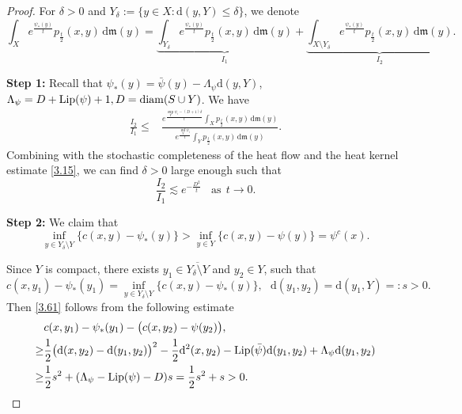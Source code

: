 \documentclass[a4paper,11pt]{article}
\numberwithin{equation}{section}
\theoremstyle{plain}
\theoremstyle{definition}
\theoremstyle{remark}
\newcommand{\mm}{\mathfrak m}
\newcommand{\diam}{\mathop{\rm diam}\nolimits}
\newcommand{\Lip}{\mathop{\rm Lip}\nolimits}
\renewcommand{\d}{{\mathrm d}}
\begin{document}
	\begin{proof}
	For  $\delta>0$ and $Y_\delta:=\{y\in X: \d(y, Y)\leq \delta\}$,  we denote
	\begin{equation}
		\int_X e^{\frac{\psi_{*}(y)}{t}} p_\frac{t}{2}(x,y)\,\d\mm(y)=\underbrace{\int_{Y_\delta} e^{\frac{\psi_{*}(y)}{t}} p_\frac{t}{2}(x,y)\,\d\mm(y)}_{I_1}+\underbrace{\int_{X\setminus Y_\delta} e^{\frac{\psi_{*}(y)}{t}} p_\frac{t}{2}(x,y)\,\d\mm(y)}_{I_2}.
	\end{equation}
	
	{\bf Step 1:} 
Recall that $\psi_{*}(y)=\bar \psi (y)-\Lambda_\psi\d(y,Y)$, $\Lambda_\psi=D+ \Lip(\psi) + 1,  D=\diam(S\cup Y)$.   We have
	\begin{equation}\label{ext}
		\begin{aligned}
			\frac{I_2}{I_1}
			\leq& \frac{e^{\frac{\sup_Y \psi_i-(D+1)\delta}{t}}\int_{X} p_\frac{t}{2}(x,y)\,\d\mm(y)}{e^{\frac{\inf_Y \psi_i}{t}}\int_{Y}  p_\frac{t}{2}(x,y)\,\d\mm(y)}.
		\end{aligned}
	\end{equation}
Combining with the stochastic completeness of the heat flow and the heat kernel estimate \eqref{3.15},    we can find $\delta>0$ large enough such that
 \begin{equation}\label{2.40}
     	\frac{I_2}{I_1}\lesssim  e^{-\frac{D^2}{t}}~~~~\text{as}~~t\to 0.
     \end{equation}
	
	\medskip
	
	{\bf Step 2:} We claim that
	\begin{equation}\label{3.61}
	\inf_{y\in Y_\delta\setminus Y}\{c(x,y)-\psi_{*}(y)\}>\inf_{y\in Y}\{c(x,y)-\psi(y)\}=\psi^c(x).
	\end{equation}
	
	Since $Y$ is compact,  there exists $y_1\in \overline {Y_\delta\setminus Y}$ and $y_2\in Y$,  such that 
	\begin{equation*}
	c(x,y_1)-\psi_{*}(y_1)=\inf_{y\in Y_\delta\setminus Y}\{c(x,y)-\psi_{*}(y)\},~~~\d(y_1,y_2)=\d(y_1,Y)=:s>0.
	\end{equation*}
 Then \eqref{3.61} follows from the following estimate
	\begin{equation}
	\begin{aligned}
	&c(x,y_1)-\psi_{*}(y_1)- \big(c(x,y_2)-\psi(y_2)\big),\\
	\geq & \frac{1}{2}\big(\d(x,y_2)-\d(y_1,y_2)\big)^2-\frac{1}{2}\d^2(x,y_2)-\Lip(\bar \psi)\d(y_1,y_2)+\Lambda_\psi\d(y_1,y_2)\\
	\geq & \frac{1}{2}s^2+(\Lambda_\psi-\Lip(\psi)-D)s=\frac{1}{2}s^2+s>0.
	\end{aligned}
	\end{equation}
	

\end{proof}
\end{document}
